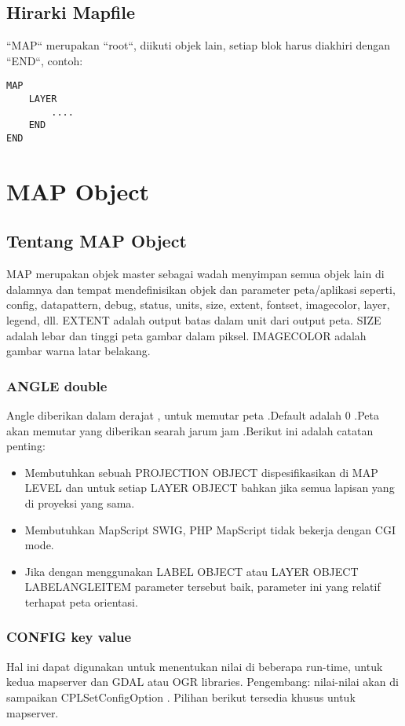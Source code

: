 \subsection{Hirarki Mapfile}
``MAP`` merupakan ``root``, diikuti objek lain, setiap blok harus diakhiri dengan ``END``, 
contoh:
\begin{verbatim}
MAP
	LAYER
		....
	END
END
\end{verbatim}


\section{MAP Object}
\subsection{Tentang MAP Object}
MAP merupakan objek master sebagai wadah menyimpan semua objek lain di dalamnya dan tempat mendefinisikan objek dan parameter 
peta/aplikasi seperti, config, datapattern, debug, status, units, size, extent, fontset, imagecolor, layer, legend, dll.
EXTENT adalah output batas dalam unit dari output peta.
SIZE adalah  lebar dan tinggi peta gambar dalam piksel.
IMAGECOLOR adalah gambar warna latar belakang.

\subsubsection{ANGLE double}
Angle diberikan dalam derajat , untuk memutar peta .Default adalah 0 .Peta akan memutar yang diberikan searah jarum jam .Berikut ini adalah catatan penting:
\begin{itemize}
	\item Membutuhkan sebuah PROJECTION OBJECT dispesifikasikan di MAP LEVEL dan untuk setiap LAYER OBJECT   bahkan jika semua lapisan yang di proyeksi   yang sama.
	\item Membutuhkan MapScript  SWIG, PHP MapScript  tidak bekerja dengan CGI mode.
	\item Jika dengan menggunakan LABEL OBJECT atau LAYER OBJECT LABELANGLEITEM parameter tersebut baik, parameter ini yang relatif terhapat peta orientasi.
\end{itemize}

\subsubsection{CONFIG key value}
Hal ini dapat digunakan untuk menentukan nilai di beberapa run-time, untuk kedua mapserver dan GDAL atau OGR libraries. Pengembang: nilai-nilai akan di sampaikan CPLSetConfigOption  . Pilihan berikut tersedia khusus untuk mapserver.

